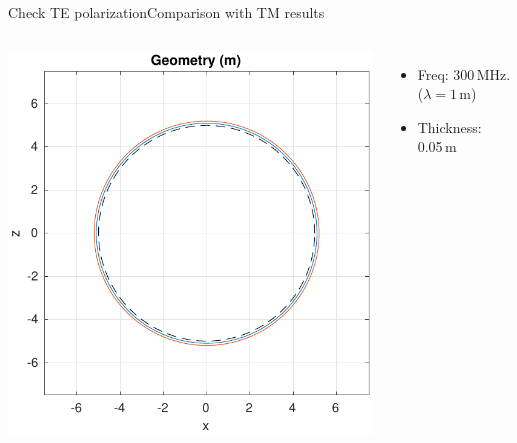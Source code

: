   \begin{frame}[allowframebreaks]{Check TE polarization}{Comparison
      with TM results}
    
    \begin{columns}
      \includegraphics[width=\linewidth]{results/TE/geometry.pdf}
      
      \begin{itemize}
      \item
        Freq: 300\,MHz. ($\lambda=1\,$m)
      \item
        Thickness: 0.05\,m
      \end{itemize}
      
    \end{columns}
    
    \framebreak
    

\end{frame}
